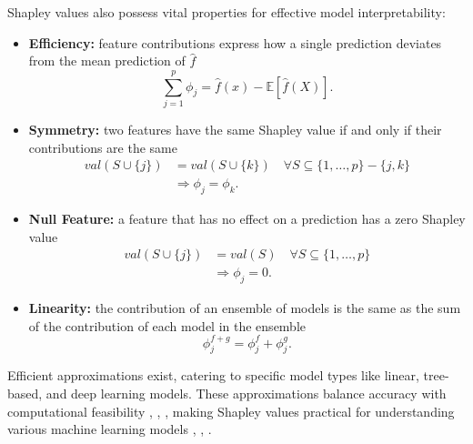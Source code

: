 \documentclass{IEEEtran}
\begin{document}
            Shapley values also possess vital properties for effective model interpretability:
            \begin{itemize}
                \item \textbf{Efficiency:} feature contributions express how a single prediction deviates from the mean prediction of $\hat{f}$\begin{equation} \label{eq:shap_efficiency}
                    \sum_{j=1}^{p} \phi_j = \hat{f}(x) - \mathbb{E}[\hat{f}(X)].
                \end{equation}
                \item \textbf{Symmetry:} two features have the same Shapley value if and only if their contributions are the same\begin{equation*}
                    \begin{split}
                        val(S \cup \{j\}) & = val(S \cup \{k\}) \quad \forall S \subseteq \{1, \dots, p\} - \{j, k\} \\
                        & \Rightarrow \phi_j = \phi_k.
                    \end{split}
                \end{equation*}
                \item \textbf{Null Feature:} a feature that has no effect on a prediction has a zero Shapley value\begin{equation*}
                    \begin{split}
                        val(S \cup \{j\}) & = val(S) \quad \forall S \subseteq \{1, \dots, p\} \\
                        & \Rightarrow \phi_j = 0.
                    \end{split}
                \end{equation*}
                \item \textbf{Linearity:} the contribution of an ensemble of models is the same as the sum of the contribution of each model in the ensemble\begin{equation*}
                    \phi_j^{f + g} = \phi_j^{f} + \phi_j^{g}.
                \end{equation*}
            \end{itemize}

            Efficient approximations exist, catering to specific model types like linear, tree-based, and deep learning models. These approximations balance accuracy with computational feasibility \cite{chen2023algorithms}, \cite{molnar2020interpretable}, \cite{shap-feature-analysis}, making Shapley values practical for understanding various machine learning models \cite{shap-health}, \cite{shap-credit-lending}, \cite{shap-extra-ml}.
\end{document}
